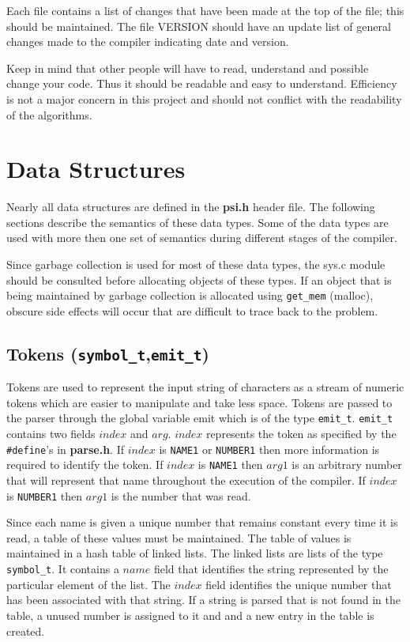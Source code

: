 Each file contains a list of changes that have been made at the top of the
file; this should be maintained.  The file VERSION should have an update
list of general changes made to the compiler indicating date and version.

Keep in mind that other people will have to read, understand and possible
change your code.  Thus it should be readable and easy to understand.
Efficiency is not a major concern in this project and should not conflict
with the readability of the algorithms.

\section{Data Structures}
Nearly all data structures are defined in the {\bf psi.h} header file.  The following
sections describe the semantics of these data types.  Some of the data types
are used with more then one set of semantics during different stages of the
compiler.

Since garbage collection is used for most of these data types, the sys.c 
module should be consulted before allocating objects of these types.  If
an object that is being maintained by garbage collection is allocated using
{\tt get\_mem} (malloc), obscure side effects will occur that are difficult to 
trace back to the problem.

\subsection{Tokens ({\tt symbol\_t},{\tt emit\_t})}
Tokens are used to represent the input string of characters as a stream
of numeric tokens which are easier to manipulate and take less space.
Tokens are passed to the parser through the global variable emit which
is of the type {\tt emit\_t}.  {\tt emit\_t} contains two fields $index$
and $arg$.
$index$ represents the token as specified by the {\tt \#define}'s in 
{\bf parse.h}.
If $index$ is {\tt NAME1} or {\tt NUMBER1} then more information is required to 
identify the token.  If $index$ is {\tt NAME1} then $arg1$ is an arbitrary
number
that will represent that name throughout the execution of the compiler.
If $index$ is {\tt NUMBER1} then $arg1$ is the number that was read.

Since each name is given a unique number that remains constant every time it
is read, a table of these values must be maintained.  The table of values
is maintained in a hash table of linked lists.  The linked lists are lists
of the type {\tt symbol\_t}.  It contains a $name$ field that identifies the string
represented by the particular element of the list.  The $index$ field 
identifies
the unique number that has been associated with that string.  If a string
is parsed that is not found in the table, a unused number is assigned to it
and and a new entry in the table is created.

